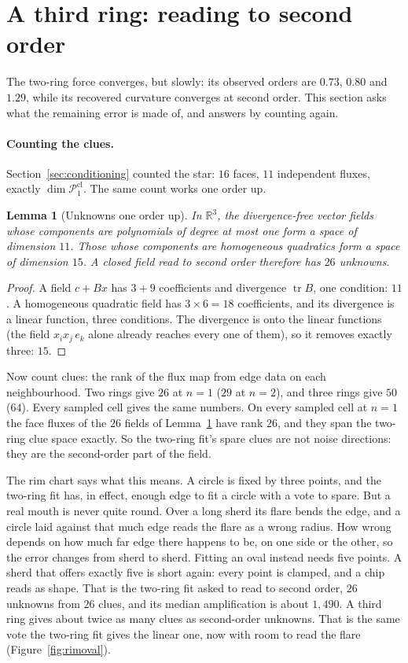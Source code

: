 \documentclass[11pt]{article}
\newtheorem{lemma}[theorem]{Lemma}
\theoremstyle{definition}
\theoremstyle{remark}
\newcommand{\RR}{\mathbb{R}}
\newcommand{\Pone}{\mathcal{P}_1^{\mathrm{cl}}}
\begin{document}


\section{A third ring: reading to second order}\label{sec:hybrid}

The two-ring force converges, but slowly: its observed orders are $0.73$, $0.80$ and $1.29$,
while its recovered curvature converges at second order. This section asks what the
remaining error is made of, and answers by counting again.

\paragraph{Counting the clues.} Section~\ref{sec:conditioning} counted the star: $16$ faces,
$11$ independent fluxes, exactly $\dim\Pone$. The same count works one order up.

\begin{lemma}[Unknowns one order up]\label{lem:count}
In $\RR^3$, the divergence-free vector fields whose components are polynomials of degree at most
one form a space of dimension $11$. Those whose components are homogeneous quadratics form a
space of dimension $15$. A closed field read to second order therefore has $26$ unknowns.
\end{lemma}
\begin{proof}
A field $c+Bx$ has $3+9$ coefficients and divergence $\operatorname{tr}B$, one condition: $11$.
A homogeneous quadratic field has $3\times6=18$ coefficients, and its divergence is a linear
function, three conditions. The divergence is onto the linear functions (the field
$x_ix_j\,e_k$ alone already reaches every one of them), so it removes exactly three: $15$.
\end{proof}

Now count clues: the rank of the flux map from edge data on each neighbourhood. Two rings give
$26$ at $n=1$ ($29$ at $n=2$), and three rings give $50$ ($64$). Every sampled cell gives the
same numbers. On every sampled cell at $n=1$ the face fluxes of the $26$ fields of
Lemma~\ref{lem:count} have rank $26$, and they span the two-ring clue space exactly. So the
two-ring fit's spare clues are not noise directions: they are the second-order part of the
field.

The rim chart says what this means. A circle is fixed by three points, and the two-ring fit
has, in effect, enough edge to fit a circle with a vote to spare. But a real mouth is never
quite round. Over a long sherd its flare bends the edge, and a circle laid against that much
edge reads the flare as a wrong radius. How wrong depends on how much far edge there happens
to be, on one side or the other, so the error changes from sherd to sherd. Fitting an oval
instead needs five points. A sherd that offers exactly five is short again: every point is
clamped, and a chip reads as shape. That is the two-ring fit asked to read to second order,
$26$ unknowns from $26$ clues, and its median amplification is about $1{,}490$. A third ring
gives about twice as many clues as second-order unknowns. That is the same vote the two-ring
fit gives the linear one, now with room to read the flare (Figure~\ref{fig:rimoval}).
\end{document}
